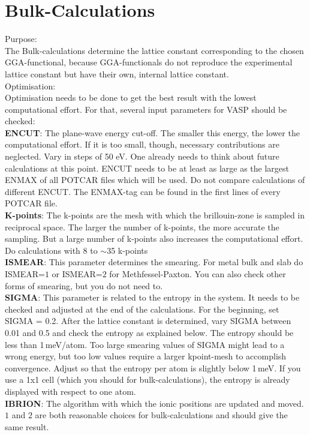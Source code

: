 \documentclass[twoside, 11pt, titlepage, captions=nooneline, a4paper, headsepline]{scrbook}%
\newcommand{\9}{\mathrm}
\newcommand{\0}{\,\mathrm}
\begin{document}
\section{Bulk-Calculations}
\label{bulk}
Purpose:\\
The Bulk-calculations determine the lattice constant corresponding to the chosen GGA-functional, because GGA-functionals do not reproduce the experimental lattice constant but have their own, internal lattice constant.\\
Optimisation:\\
Optimisation needs to be done to get the best result with the lowest computational effort. For that, several input parameters for VASP should be checked:\\
\textbf{ENCUT}: The plane-wave energy cut-off. The smaller this energy, the lower the computational effort. If it is too small, though, necessary contributions are neglected. Vary in steps of 50 eV. One already needs to think about future calculations at this point. ENCUT needs to be at least as large as the largest ENMAX of all POTCAR files which will be used. Do not compare calculations of different ENCUT. The ENMAX-tag can be found in the first lines of every POTCAR file.\\
\textbf{K-points}: The k-points are the mesh with which the brillouin-zone is sampled in reciprocal space. The larger the number of k-points, the more accurate the sampling. But a large number of k-points also increases the computational effort. Do calculations with 8 to $\sim$35 k-points\\
\textbf{ISMEAR}: This parameter determines the smearing. For metal bulk and slab do ISMEAR=$1$ or ISMEAR=$2$ for Methfessel-Paxton. You can also check other forms of smearing, but you do not need to.\\
\textbf{SIGMA}: This parameter is related to the entropy in the system. It needs to be checked and adjusted at the end of the calculations. For the beginning, set SIGMA = 0.2. After the lattice constant is determined, vary SIGMA between 0.01 and 0.5 and check the entropy as explained below. The entropy should be less than 1\,meV/atom. Too large smearing values of SIGMA might lead to a wrong energy, but too low values require a larger kpoint-mesh to accomplish convergence. Adjust so that the entropy per atom is slightly below 1\,meV. If you use a 1x1 cell (which you should for bulk-calculations), the entropy is already displayed with respect to one atom.\\
\textbf{IBRION}: The algorithm with which the ionic positions are updated and moved. $1$ and $2$ are both reasonable choices for bulk-calculations and should give the same result.\\
\end{document}
